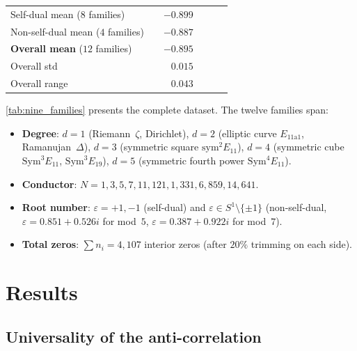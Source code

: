 \documentclass[11pt, a4paper]{article}
\theoremstyle{plain}
\theoremstyle{definition}
\begin{document}
\begin{table}[t]
\begin{tabular}{llrrrlll}
\midrule
\multicolumn{3}{l}{Self-dual mean ($8$ families)}  & & $-0.899$ &                   &                        & \\
\multicolumn{3}{l}{Non-self-dual mean ($4$ families)} & & $-0.887$ &                &                        & \\
\multicolumn{3}{l}{\textbf{Overall mean} ($12$ families)} & & $\bm{-0.895}$ &        &                        & \\
\multicolumn{3}{l}{Overall std}                     & & $0.015$ &                    &                        & \\
\multicolumn{3}{l}{Overall range}                   & & $0.043$ &                    &                        & \\
\bottomrule
\end{tabular}
\end{table}

\cref{tab:nine_families} presents the complete dataset.
The twelve families span:
\begin{itemize}
  \item \textbf{Degree}: $d = 1$ (Riemann~$\zeta$, Dirichlet),
        $d = 2$ (elliptic curve $E_{11\mathrm{a}1}$, Ramanujan~$\Delta$),
        $d = 3$ (symmetric square $\mathrm{sym}^2 E_{11}$),
        $d = 4$ (symmetric cube $\mathrm{Sym}^3 E_{11}$,
        $\mathrm{Sym}^3 E_{19}$),
        $d = 5$ (symmetric fourth power $\mathrm{Sym}^4 E_{11}$).
  \item \textbf{Conductor}: $N = 1, 3, 5, 7, 11, 121, 1{,}331, 6{,}859, 14{,}641$.
  \item \textbf{Root number}: $\varepsilon = +1, -1$ (self-dual)
        and $\varepsilon \in S^1 \setminus \{\pm 1\}$ (non-self-dual,
        $\varepsilon = 0.851 + 0.526i$ for mod~$5$,
        $\varepsilon = 0.387 + 0.922i$ for mod~$7$).
  \item \textbf{Total zeros}: $\sum n_i = 4{,}107$ interior zeros
        (after $20\%$ trimming on each side).
\end{itemize}


\section{Results}
\label{sec:results}

\subsection{Universality of the anti-correlation}
\label{ssec:universality}
\end{document}
